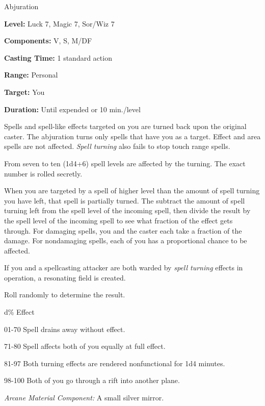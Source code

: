 
Abjuration

\textbf{Level:} Luck 7, Magic 7, Sor/Wiz 7

\textbf{Components:} V, S, M/DF

\textbf{Casting Time:} 1 standard action

\textbf{Range:} Personal

\textbf{Target:} You

\textbf{Duration:} Until expended or 10 min./level

Spells and spell-like effects targeted on you are turned back upon the original 
caster. The abjuration turns only spells that have you as a target. Effect and 
area spells are not affected. \textit{Spell turning} also fails to stop touch range 
spells. 

From seven to ten (1d4+6) spell levels are affected by the turning. The exact number 
is rolled secretly.

When you are targeted by a spell of higher level than the amount of spell turning 
you have left, that spell is partially turned. The subtract the amount of spell 
turning left from the spell level of the incoming spell, then divide the result 
by the spell level of the incoming spell to see what fraction of the effect gets 
through. For damaging spells, you and the caster each take a fraction of the damage. 
For nondamaging spells, each of you has a proportional chance to be affected.

If you and a spellcasting attacker are both warded by \textit{spell turning} effects 
in operation, a resonating field is created.

Roll randomly to determine the result.

\begin{description*}
\item[d\%] Effect
\item[01-70] Spell drains away without effect.
\item[71-80] Spell affects both of you equally at full effect.
\item[81-97] Both turning effects are rendered nonfunctional for 1d4 minutes.
\item[98-100] Both of you go through a rift into another plane.
\end{description*}

\textit{Arcane Material Component:} A small silver mirror.

